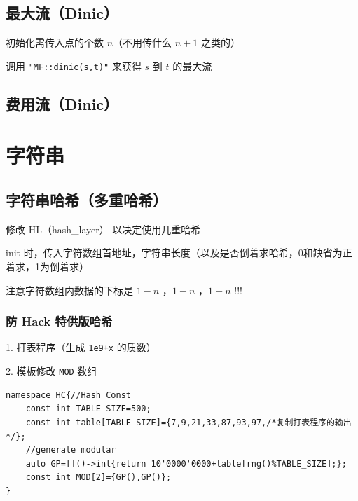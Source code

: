\documentclass[12pt]{article}
\begin{document}


\newpage

\subsection{最大流（Dinic）}

初始化需传入点的个数 $n$（不用传什么 $n+1$ 之类的）

调用 \texttt{"MF::dinic(s,t)"} 来获得 $s$ 到 $t$ 的最大流



\newpage

\subsection{费用流（Dinic）}



\newpage

{\centering\section{字符串}}

\subsection{字符串哈希（多重哈希）}

修改 HL（hash\_{}layer） 以决定使用几重哈希

init 时，传入字符数组首地址，字符串长度（以及是否倒着求哈希，0和缺省为正着求，1为倒着求）

注意字符数组内数据的下标是 $1-n$ ，$1-n$ ，$1-n$ !!!



\newpage

\subsubsection{防 Hack 特供版哈希}

1. 打表程序（生成 \texttt{1e9+x} 的质数）



2. 模板修改 \texttt{MOD} 数组

\begin{lstlisting}[style=C++]
namespace HC{//Hash Const
	const int TABLE_SIZE=500;
	const int table[TABLE_SIZE]={7,9,21,33,87,93,97,/*复制打表程序的输出*/};
	//generate modular
	auto GP=[]()->int{return 10'0000'0000+table[rng()%TABLE_SIZE];};
	const int MOD[2]={GP(),GP()};
}
\end{lstlisting}
\end{document}
